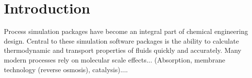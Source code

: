 \message{ !name(main.tex)}\documentclass[12pt]{UoAthesis}
\begin{document}









\chapter{Introduction}

Process simulation packages have become an integral part of chemical
engineering design. Central to these simulation software packages is
the ability to calculate thermodynamic and transport properties of
fluids quickly and accurately. Many modern processes rely on molecular
scale effects... (Absorption, membrane technology (reverse osmosis),
catalysis)....
\end{document}
